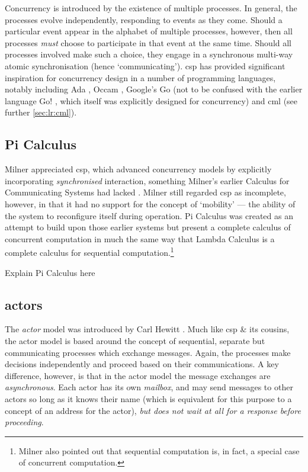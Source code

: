 Concurrency is introduced by the existence of multiple processes.  In general, the processes evolve independently, responding to events as they come.  Should a particular event appear in the alphabet of multiple processes, however, then all processes \emph{must} choose to participate in that event at the same time.  Should all processes involved make such a choice, they engage in a synchronous multi-way atomic synchronisation (hence `communicating').  \gls{csp} has provided significant inspiration for concurrency design in a number of programming languages, notably including Ada \cite{Defense1983,Taft2013}, Occam \cite{Elizabeth1987}, Google's Go \cite{Meyerson2014} (not to be confused with the earlier language Go! \cite{Clark2004}, which itself was explicitly designed for concurrency) and \gls{cml} \cite{Reppy2011} (see further \vref{sec:lr:cml}).

\subsection{Pi Calculus}

Milner appreciated \gls{csp}, which advanced concurrency models by explicitly incorporating \emph{synchronised} interaction, something Milner's earlier Calculus for Communicating Systems \cite{Milner1980} had lacked  \cite{Milner1993}.  Milner still regarded \gls{csp} as incomplete, however, in that it had no support for the concept of `mobility' --- \ie{} the ability of the system to reconfigure itself during operation.  Pi Calculus was created as an attempt to build upon those earlier systems but present a complete calculus of concurrent computation in much the same way that Lambda Calculus \cite{Barendregt1984} is a complete calculus for sequential computation.\footnote{Milner also pointed out that sequential computation is, in fact, a special case of concurrent computation.}

\begin{anfxerror}
Explain Pi Calculus here
\end{anfxerror}

\subsection{\label{subsec:lr:actors}\texorpdfstring{\Glspl{actor}}{Actors}}
The \emph{\Gls{actor}} \cite{Agha1986,Agha1997} model was introduced by Carl Hewitt \cite{Hewitt1973}.  Much like \gls{csp} \& its cousins, the \Gls{actor} model is based around the concept of sequential, separate but communicating processes which exchange messages.  Again, the processes make decisions independently and proceed based on their communications.  A key difference, however, is that in the \Gls{actor} model the message exchanges are \emph{asynchronous}.  Each \gls{actor} has its own \emph{mailbox}, and may send messages to other \glspl{actor} so long as it knows their name (which is equivalent for this purpose to a concept of an address for the \gls{actor}), \emph{but does not wait at all for a response before proceeding}.

